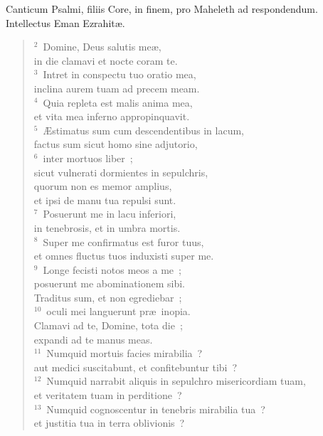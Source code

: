 \lettrine[lines=3,image=true,loversize=0.05,lraise=-0.03]{C}{}anticum Psalmi, filiis Core, in finem, pro Maheleth ad respondendum. Intellectus Eman Ezrahit\ae .
\begin{flushleft}\begin{verse}\vspace{6pt}${}^{2}$~Domine, Deus salutis me\ae ,\\ in die clamavi et nocte coram te.\\
${}^{3}$~Intret in conspectu tuo oratio mea,\\ inclina aurem tuam ad precem meam.\\
${}^{4}$~Quia repleta est malis anima mea,\\ et vita mea inferno appropinquavit.\\
${}^{5}$~\AE stimatus sum cum descendentibus in lacum,\\ factus sum sicut homo sine adjutorio,\\
${}^{6}$~inter mortuos liber~;\\ sicut vulnerati dormientes in sepulchris,\\ quorum non es memor amplius,\\ et ipsi de manu tua repulsi sunt.\\
${}^{7}$~Posuerunt me in lacu inferiori,\\ in tenebrosis, et in umbra mortis.\\
${}^{8}$~Super me confirmatus est furor tuus,\\ et omnes fluctus tuos induxisti super me.\\
${}^{9}$~Longe fecisti notos meos a me~;\\ posuerunt me abominationem sibi.\\ Traditus sum, et non egrediebar~;\\
${}^{10}$~oculi mei languerunt pr\ae\ inopia.\\ Clamavi ad te, Domine, tota die~;\\ expandi ad te manus meas.\\
${}^{11}$~Numquid mortuis facies mirabilia~?\\ aut medici suscitabunt, et confitebuntur tibi~?\\
${}^{12}$~Numquid narrabit aliquis in sepulchro misericordiam tuam,\\ et veritatem tuam in perditione~?\\
${}^{13}$~Numquid cognoscentur in tenebris mirabilia tua~?\\ et justitia tua in terra oblivionis~?\\

\end{verse}
\end{flushleft}
